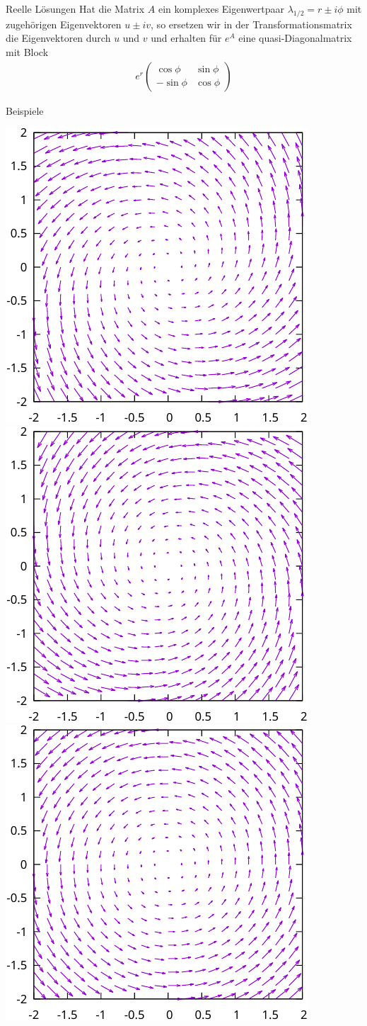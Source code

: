 \begin{frame}
  \begin{block}{Reelle Lösungen}
    Hat die Matrix $A$ ein komplexes Eigenwertpaar
    $\lambda_{1/2} = r\pm i\phi$ mit zugehörigen Eigenvektoren
    $u\pm iv$, so ersetzen wir in der Transformationsmatrix die
    Eigenvektoren durch $u$ und $v$ und erhalten für $e^A$ eine
    quasi-Diagonalmatrix mit Block
    \begin{gather*}
      e^r
      \begin{pmatrix}
        \cos\phi & \sin\phi\\
        -\sin\phi & \cos \phi
      \end{pmatrix}
    \end{gather*}
  \end{block}
\end{frame}

\begin{frame}{Beispiele}
  \begin{center}
    \includegraphics[width=.32\textwidth]{gnuplot/linear-cp-crop.pdf}
    \hfill
    \includegraphics[width=.32\textwidth]{gnuplot/linear-cm-crop.pdf}
    \hfill
    \includegraphics[width=.32\textwidth]{gnuplot/linear-c0-crop.pdf}
  \end{center}  
\end{frame}

